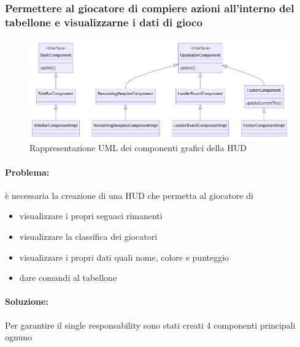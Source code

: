 \subsubsection*{Permettere al giocatore di compiere azioni all'interno del tabellone e visualizzarne i dati di gioco}
\begin{figure}[ht]
    \centering\includegraphics[]{images/HUD_uml.png}
    \caption{Rappresentazione UML dei componenti grafici della HUD}
\end{figure}
\paragraph{Problema:}
è necessaria la creazione di una HUD che permetta al giocatore di
\begin{itemize}
    \item visualizzare i propri seguaci rimanenti
    \item visualizzare la classifica dei giocatori
    \item visualizzare i propri dati quali nome, colore e punteggio
    \item dare comandi al tabellone
\end{itemize}
\paragraph{Soluzione:}
Per garantire il single responsability sono stati creati 4 componenti principali ognuno

